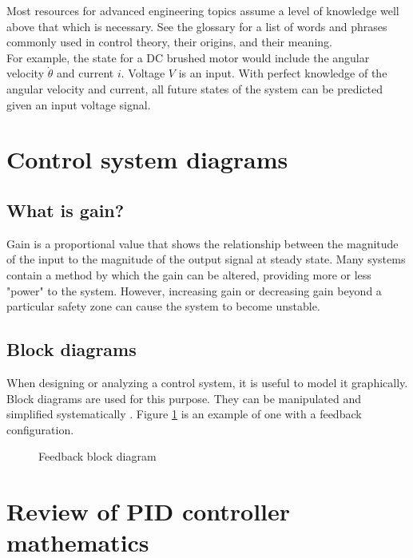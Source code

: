 \documentclass[10pt,conference,compsoc]{IEEEtran}
\begin{document}
\noindent Most resources for advanced engineering topics assume a level of
knowledge well above that which is necessary. See the glossary for a list of
words and phrases commonly used in control theory, their origins, and their
meaning. \\

\noindent For example, the \gls{state} for a DC brushed motor would include the
angular velocity $\dot{\theta}$ and current $i$. Voltage $V$ is an input. With
perfect knowledge of the angular velocity and current, all future states of the
system can be predicted given an input voltage signal. \\

\section{Control system diagrams}

\subsection{What is gain?}

\noindent Gain is a proportional value that shows the relationship between the
magnitude of the input to the magnitude of the output signal at steady state.
Many systems contain a method by which the gain can be altered, providing more
or less "power" to the system. However, increasing gain or decreasing gain
beyond a particular safety zone can cause the system to become unstable.

\subsection{Block diagrams}

\noindent When designing or analyzing a control system, it is useful to model it
graphically. Block diagrams are used for this purpose. They can be manipulated
and simplified systematically \cite{bib:block_diagrams}. Figure
\ref{fig:feedback_loop} is an example of one with a feedback configuration.

\begin{figure}[H]
  \centering
  \def\svgwidth{0.5\columnwidth}
  
  \caption{Feedback block diagram}
  \label{fig:feedback_loop}
\end{figure}

\section{Review of PID controller mathematics}
\end{document}
